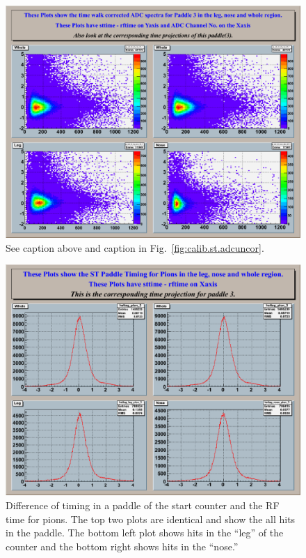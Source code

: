 \begin{figure}[htbp]\begin{center}
\includegraphics[width=0.65\columnwidth]{figures/calib/st/Corrected_adc.eps}
\caption[]{\label{fig:calib.st.adccor}See caption above and caption in Fig.~\ref{fig:calib.st.adcuncor}.}
\end{center}\end{figure}

\begin{figure}[htbp]\begin{center}
\includegraphics[width=0.65\columnwidth]{figures/calib/st/Hpad3_sttag_pion.eps}
\caption[]{\label{fig:calib.st.timepion}Difference of timing in a paddle of the start counter and the RF time for pions. The top two plots are identical and show the all hits in the paddle. The bottom left plot shows hits in the ``leg'' of the counter and the bottom right shows hits in the ``nose.''}
\end{center}\end{figure}

